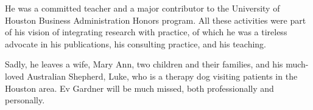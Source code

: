\documentclass[11pt, a4paper]{article}
\begin{document}
He was a committed teacher and a major contributor to the University of Houston Business Administration Honors program. All these activities were part of his vision of integrating research with practice, of which he was a tireless advocate in his publications, his consulting practice, and his teaching.

Sadly, he leaves a wife, Mary Ann, two children and their families, and his much-loved Australian Shepherd, Luke, who is a therapy dog visiting patients in the Houston area. Ev Gardner will be much missed, both professionally and personally.


\printbibliography

\end{document}
